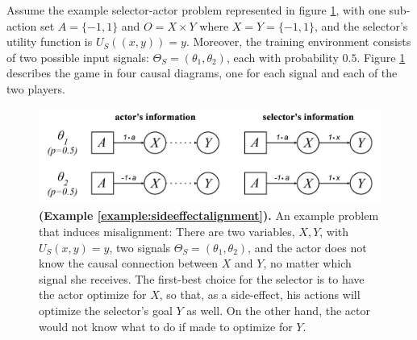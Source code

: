  
\newcommand{\examplesideffectalignment}{Assume the example selector-actor problem represented in figure \ref{fig:side-effect-aligned}, with one sub-action set $A=\{-1,1\}$ and $O=X\times Y$ where $X=Y=\{-1,1\}$, and the selector's utility function is $U_S((x,y))=y$. Moreover, the training environment consists of two possible input signals: $\Theta_S=(\theta_1,\theta_2)$, each with probability $0.5$. Figure \ref{fig:side-effect-aligned} describes the game in four causal diagrams, one for each signal and each of the two players.}
\begin{example}\label{example:sideeffectalignment}
 	\textnormal{\examplesideffectalignment}

 \end{example}
\newcommand{\examplesideffectalignmentfigurecaption}{An example problem that induces misalignment: There are two variables, $X,Y$, with $U_S(x,y)=y$, two signals $\Theta_S=(\theta_1,\theta_2)$, and the actor does not know the causal connection between $X$ and $Y$, no matter which signal she receives. The first-best choice for the selector is to have the actor optimize for $X$, so that, as a side-effect, his actions will optimize the selector's goal $Y$ as well. On the other hand, the actor would not know what to do if made to optimize for $Y$.}
 \begin{figure}[H]
 	\centering
 	\captionsetup{labelfont=bf,font=small,labelsep=period}
 	\includegraphics[width=0.7\linewidth]{"images/examples/1-sideeffect"}
 	\caption{\rightskip=20pt\leftskip=20pt \textbf{(Example \ref{example:sideeffectalignment}).} \examplesideffectalignmentfigurecaption}
 	\label{fig:side-effect-aligned} 	
 \end{figure}
 
